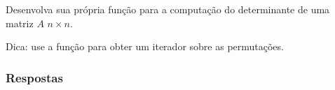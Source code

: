 \begin{exer}
  Desenvolva sua própria função {\python} para a computação do determinante de uma matriz $A$ $n\times n$.
\end{exer}
\begin{resp}
  Dica: use a função {\PYTHONintertoolsDOTpermutations} para obter um iterador sobre as permutações.
\end{resp}

\ifisbook
\subsubsection{Respostas}
\shipoutAnswer
\fi
